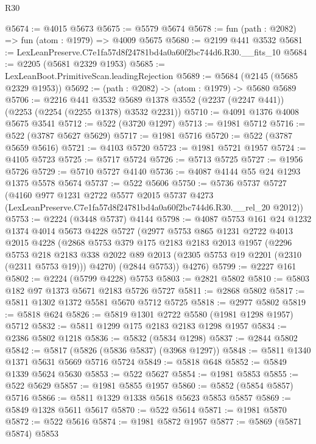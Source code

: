 \begin{lexlean}{R30}
\begin{coremodule}
@5674 := @4015 @5673
@5675 := @5579 @5674
@5678 := fun (path : @2082) => fun (atom : @1979) => @4009 @5675
@5680 := @2199 @441 @3532
@5681 := LexLeanPreserve.C7e1fa57d8f24781bd4a0a60f2bc744d6.R30.__fits_10
@5684 := @2205 (@5681 @2329 @1953)
@5685 := LexLeanBoot.PrimitiveScan.leadingRejection
@5689 := @5684 (@2145 (@5685 @2329 @1953))
@5692 := (path : @2082) -> (atom : @1979) -> @5680 @5689
@5706 := @2216
    @441
    @3532
    @5689
    @1378
    @3552
    (@2237 (@2247 @441))
    (@2253 (@2254 (@2255 @1378) @3532 @2231))
@5710 := @4091 @1376 @4008 @5675 @3541
@5712 := @522 (@3720 @1297)
@5713 := @1981 @5712
@5716 := @522 (@3787 @5627 @5629)
@5717 := @1981 @5716
@5720 := @522 (@3787 @5659 @5616)
@5721 := @4103 @5720
@5723 := @1981 @5721 @1957
@5724 := @4105 @5723
@5725 := @5717 @5724
@5726 := @5713 @5725
@5727 := @1956 @5726
@5729 := @5710 @5727 @4140
@5736 := @4087 @4144 @55 @24 @1293 @1375 @5578 @5674
@5737 := @522 @5606
@5750 := @5736
    @5737
    @5727
    (@4160
      @977
      @1231
      @2722
      @5577
      @2015
      @5737
      @4273
      (LexLeanPreserve.C7e1fa57d8f24781bd4a0a60f2bc744d6.R30.__rel_20 @2012))
@5753 := @2224 (@3448 @5737) @4144
@5798 := @4087
    @5753
    @161
    @24
    @1232
    @1374
    @4014
    @5673
    @4228
    @5727
    (@2977
      @5753
      @865
      @1231
      @2722
      @4013
      @2015
      @4228
      (@2868
        @5753
        @379
        @175
        @2183
        @2183
        @2013
        @1957
        (@2296
          @5753
          @218
          @2183
          @338
          @2022
          @89
          @2013
          (@2305 @5753 @19 @2201 (@2310 (@2311 @5753 @19)))
          @4270)
        (@2844 @5753))
      @4276)
@5799 := @2227 @161
@5802 := @2224 (@5799 @4228) @5753
@5803 := @2821 @5802
@5810 := @5803 @182 @97 @1373 @5671 @2183 @5726 @5727
@5811 := @2868 @5802
@5817 := @5811 @1302 @1372 @5581 @5670 @5712 @5725
@5818 := @2977 @5802
@5819 := @5818 @624
@5826 := @5819 @1301 @2722 @5580 (@1981 @1298 @1957) @5712
@5832 := @5811 @1299 @175 @2183 @2183 @1298 @1957
@5834 := @2386 @5802 @1218
@5836 := @5832 (@5834 @1298)
@5837 := @2844 @5802
@5842 := @5817 (@5826 (@5836 @5837) (@3968 @1297))
@5848 := @5811 @1340 @1371 @5631 @5669 @5716 @5724
@5849 := @5818 @648
@5852 := @5849 @1339 @5624 @5630
@5853 := @522 @5627
@5854 := @1981 @5853
@5855 := @522 @5629
@5857 := @1981 @5855 @1957
@5860 := @5852 (@5854 @5857) @5716
@5866 := @5811 @1329 @1338 @5618 @5623 @5853 @5857
@5869 := @5849 @1328 @5611 @5617
@5870 := @522 @5614
@5871 := @1981 @5870
@5872 := @522 @5616
@5874 := @1981 @5872 @1957
@5877 := @5869 (@5871 @5874) @5853

\end{coremodule}
\end{lexlean}
